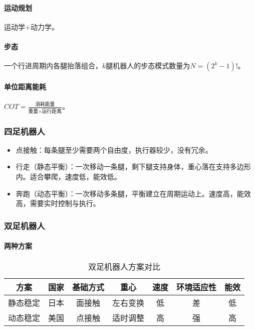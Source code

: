 \documentclass[
12pt, %
a4paper, 
oneside, %
headinclude,footinclude, %
]{scrartcl}
\begin{document}
\paragraph{运动规划}
运动学+动力学。
\paragraph{步态}
一个行进周期内各腿抬落组合，$ k $腿机器人的步态模式数量为$ N = (2^k - 1)! $。
\paragraph{单位距离能耗}
$ COT = \frac{\text{消耗能量}}{\text{重量} \times \text{运行距离}} $。
\subsubsection[四足机器人]{四足机器人}
\begin{itemize}
\item 点接触：每条腿至少需要两个自由度，执行器较少，没有冗余。
\item 行走（静态平衡）：一次移动一条腿，剩下腿支持身体，重心落在支持多边形内。适合攀爬，速度低，能效低。
\item 奔跑（动态平衡）：一次移动多条腿，平衡建立在周期运动上。速度高，能效高，需要实时控制与执行。
\end{itemize}
\subsubsection[双足机器人]{双足机器人}
\paragraph{两种方案}
\begin{table}[H]
\centering
\begin{tabular}{|c|c|c|c|c|c|c|}
\hline
方案 & 国家 & 基础方式 & 重心 & 速度 & 环境适应性 & 能效 \\
\hline
静态稳定 & 日本 & 面接触 & 左右变换 & 低 & 差 & 低 \\
\hline
动态稳定 & 美国 & 点接触 & 适时调整 & 高 & 强 & 高 \\
\hline
\end{tabular}
\caption{双足机器人方案对比}
\end{table}
\end{document}
